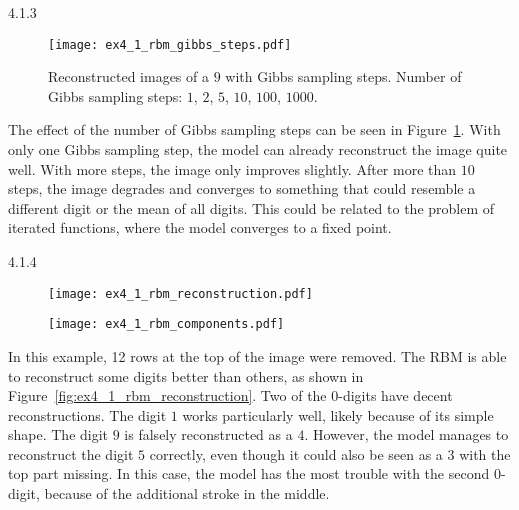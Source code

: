 \begin{task}{4.1.3}
\end{task}

\begin{figure}[ht]
  \centering
  \texttt{[image: ex4\_1\_rbm\_gibbs\_steps.pdf]}
  \caption{Reconstructed images of a $9$ with Gibbs sampling steps. Number of Gibbs sampling steps:
    $1$, $2$, $5$, $10$, $100$, $1000$.}
  \label{fig:ex4_1_rbm_gibbs_steps}
\end{figure}

The effect of the number of Gibbs sampling steps can be seen in
Figure~\ref{fig:ex4_1_rbm_gibbs_steps}. With only one Gibbs sampling step, the model can already
reconstruct the image quite well. With more steps, the image only improves slightly. After more than
$10$ steps, the image degrades and converges to something that could resemble a different digit or
the mean of all digits. This could be related to the problem of iterated functions, where the model
converges to a fixed point.

\begin{task}{4.1.4}
\end{task}

\begin{figure}[ht!]
  \centering
  \begin{minipage}{0.48\textwidth}
    \centering
    \texttt{[image: ex4\_1\_rbm\_reconstruction.pdf]}
    \label{fig:ex4_1_rbm_reconstruction}
  \end{minipage}
  \begin{minipage}{0.48\textwidth}
    \centering
    \texttt{[image: ex4\_1\_rbm\_components.pdf]}
    \label{fig:ex4_1_rbm_components}
  \end{minipage}
\end{figure}

In this example, 12 rows at the top of the image were removed. The RBM is able to reconstruct some
digits better than others, as shown in Figure~\ref{fig:ex4_1_rbm_reconstruction}. Two of the
$0$-digits have decent reconstructions. The digit $1$ works particularly well, likely because of its
simple shape. The digit $9$ is falsely reconstructed as a $4$. However, the model manages to
reconstruct the digit $5$ correctly, even though it could also be seen as a $3$ with the top part
missing. In this case, the model has the most trouble with the second $0$-digit, because of the
additional stroke in the middle.



